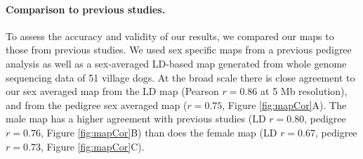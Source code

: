 \paragraph{Comparison to previous studies.}
To assess the accuracy and validity of our results, we compared our maps to those from previous studies.
We used sex specific maps from a previous pedigree analysis\cite{Wong2010} as well as a sex-averaged LD-based map generated from whole genome sequencing data of 51 village dogs\cite{Auton2013}.
At the broad scale there is close agreement to our sex averaged map from the LD map (Pearson $r=0.86$ at 5 Mb resolution), and from the pedigree sex averaged map ($r=0.75$, Figure \ref{fig:mapCor}A).
The male map has a higher agreement with previous studies (LD $r=0.80$, pedigree $r=0.76$, Figure \ref{fig:mapCor}B) than does the female map (LD $r=0.67$, pedigree $r=0.73$, Figure \ref{fig:mapCor}C).


